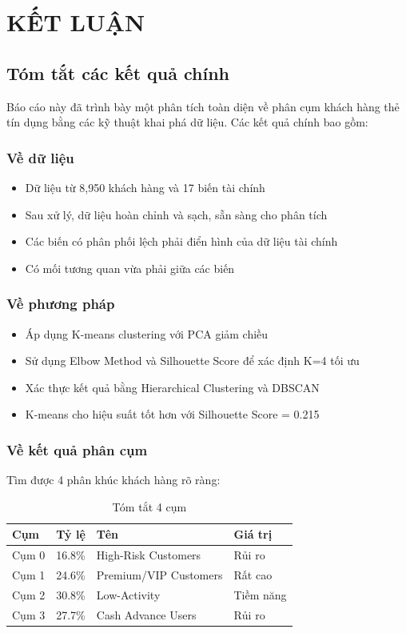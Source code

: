 \chapter{KẾT LUẬN}

\section{Tóm tắt các kết quả chính}

Báo cáo này đã trình bày một phân tích toàn diện về phân cụm khách hàng thẻ tín dụng bằng các kỹ thuật khai phá dữ liệu. Các kết quả chính bao gồm:

\subsection{Về dữ liệu}

\begin{itemize}
    \item Dữ liệu từ 8,950 khách hàng và 17 biến tài chính
    \item Sau xử lý, dữ liệu hoàn chỉnh và sạch, sẵn sàng cho phân tích
    \item Các biến có phân phối lệch phải điển hình của dữ liệu tài chính
    \item Có mối tương quan vừa phải giữa các biến
\end{itemize}

\subsection{Về phương pháp}

\begin{itemize}
    \item Áp dụng K-means clustering với PCA giảm chiều
    \item Sử dụng Elbow Method và Silhouette Score để xác định K=4 tối ưu
    \item Xác thực kết quả bằng Hierarchical Clustering và DBSCAN
    \item K-means cho hiệu suất tốt hơn với Silhouette Score = 0.215
\end{itemize}

\subsection{Về kết quả phân cụm}

Tìm được 4 phân khúc khách hàng rõ ràng:

\begin{table}[H]
\centering
\caption{Tóm tắt 4 cụm}
\begin{tabular}{|l|r|l|l|}
\hline
\textbf{Cụm} & \textbf{Tỷ lệ} & \textbf{Tên} & \textbf{Giá trị} \\
\hline
Cụm 0 & 16.8\% & High-Risk Customers & Rủi ro \\
\hline
Cụm 1 & 24.6\% & Premium/VIP Customers & Rất cao \\
\hline
Cụm 2 & 30.8\% & Low-Activity & Tiềm năng \\
\hline
Cụm 3 & 27.7\% & Cash Advance Users & Rủi ro \\
\hline
\end{tabular}
\end{table}

